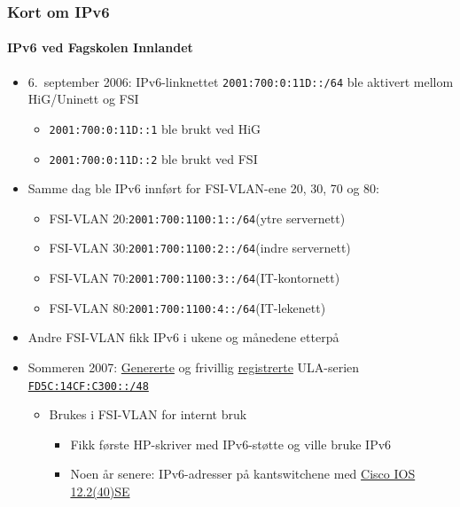 \begin{frame}%
  \frametitle{Kort om IPv6}
  \framesubtitle{IPv6 ved Fagskolen Innlandet}
  \begin{itemize}[<+->]
  \item 6.~september 2006: IPv6-linknettet
    \texttt{2001:700:0:11D::/64} ble aktivert mellom HiG/Uninett og
    FSI
    \begin{itemize}[<+->]
    \item \texttt{2001:700:0:11D::1} ble brukt ved HiG
    \item \texttt{2001:700:0:11D::2} ble brukt ved FSI
    \end{itemize}
  \item Samme dag ble IPv6 innført for FSI-VLAN-ene 20, 30, 70 og 80:
    \begin{itemize}[<+->]
    \item FSI-VLAN 20:\quad\texttt{2001:700:1100:1::/64}\hfill(ytre servernett)
    \item FSI-VLAN 30:\quad\texttt{2001:700:1100:2::/64}\hfill(indre servernett)
    \item FSI-VLAN 70:\quad\texttt{2001:700:1100:3::/64}\hfill(IT-kontornett)
    \item FSI-VLAN 80:\quad\texttt{2001:700:1100:4::/64}\hfill(IT-lekenett)
    \end{itemize}
  \item Andre FSI-VLAN fikk IPv6 i ukene og månedene etterpå
  \item Sommeren 2007:
    \href{http://www.sixxs.net/tools/grh/ula/}{Genererte} og frivillig
    \href{http://www.sixxs.net/tools/grh/ula/list/}{registrerte}
    ULA-serien
    \href{http://www.sixxs.net/tools/whois/?fd5c:14cf:c300::/48}{\texttt{FD5C:14CF:C300::/48}}
    \begin{itemize}[<+->]
    \item Brukes i FSI-VLAN for internt bruk
      \begin{itemize}[<+->]
      \item Fikk første HP-skriver med IPv6-støtte og ville bruke IPv6
      \item Noen år senere: IPv6-adresser på kantswitchene med
        \href{http://www.cisco.com/en/US/docs/switches/lan/catalyst3750/software/release/12.2_40_se/release/notes/OL13860.html}{Cisco
          IOS 12.2(40)SE}
      \end{itemize}
    \end{itemize}
  \end{itemize}
\end{frame}

